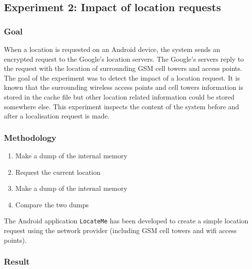 \subsection{Experiment 2: Impact of location requests}

\subsubsection{Goal}

When a location is requested on an Android device, the system sends an encrypted request to the Google's location servers.
The Google's servers reply to the request with the location of surrounding GSM cell towers and access points.\\

The goal of the experiment was to detect the impact of a location request.
It is known that the surrounding wireless access points and cell towers information is stored in the cache file but other location related information could be stored somewhere else.
This experiment inspects the content of the system before and after a localisation request is made.


\subsubsection{Methodology}

\begin{enumerate}
\item Make a dump of the internal memory
\item Request the current location
\item Make a dump of the internal memory
\item Compare the two dumps
\end{enumerate}

The Android application \texttt{LocateMe} has been developed to create a simple location request using the network provider (including GSM cell towers and wifi access points).

\subsubsection{Result}

